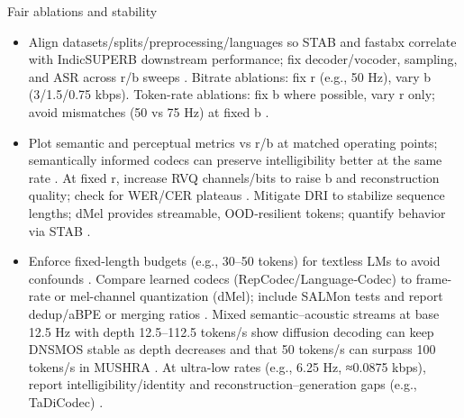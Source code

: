 \documentclass{article}
\begin{document}
Fair ablations and stability
\begin{itemize}
  \item Align datasets/splits/preprocessing/languages so STAB and fastabx correlate with IndicSUPERB downstream performance; fix decoder/vocoder, sampling, and ASR across r/b sweeps \cite{vashishth2024stabspeechtokenizerassessmentbenchmark,poli2025fastabxlibraryefficientcomputationabxdis,entry2025indicsuperbspeechprocessinguniversalperf}. Bitrate ablations: fix r (e.g., 50 Hz), vary b (3/1.5/0.75 kbps). Token-rate ablations: fix b where possible, vary r only; avoid mismatches (50 vs 75 Hz) at fixed b \cite{ahasan2025dmcodecdistillingmultimodalrepresentatio,li2024investigatingneuralaudiocodecsspeechlang}.
  \item Plot semantic and perceptual metrics vs r/b at matched operating points; semantically informed codecs can preserve intelligibility better at the same rate \cite{ye2024codecdoesmatterexploringsemanticshortcom}. At fixed r, increase RVQ channels/bits to raise b and reconstruction quality; check for WER/CER plateaus \cite{li2024investigatingneuralaudiocodecsspeechlang}. Mitigate DRI to stabilize sequence lengths; dMel provides streamable, OOD‑resilient tokens; quantify behavior via STAB \cite{bai2025dmelspeechtokenizationmadesimple,liu2024analyzingmitigatinginconsistencydiscrete,vashishth2024stabspeechtokenizerassessmentbenchmark}.
  \item Enforce fixed-length budgets (e.g., 30–50 tokens) for textless LMs to avoid confounds \cite{hsu2024exploringcontextlearningtextlessspeechla}. Compare learned codecs (RepCodec/Language‑Codec) to frame-rate or mel-channel quantization (dMel); include SALMon tests and report dedup/aBPE or merging ratios \cite{huang2024repcodecspeechrepresentationcodectokeniz,ji2025languagecodecbridgingdiscreterepresentat,zhang2025impactframeratesspeechtokenizercasestudy,maimon2025salmonsuiteacousticlanguagemodelevaluati}. Mixed semantic–acoustic streams at base 12.5 Hz with depth 12.5–112.5 tokens/s show diffusion decoding can keep DNSMOS stable as depth decreases and that 50 tokens/s can surpass 100 tokens/s in MUSHRA \cite{yang2025diffsoundstreamefficientspeechtokenizati,zeng2024scalingspeechtextpretrainingsyntheticint}. At ultra-low rates (e.g., 6.25 Hz, ≈0.0875 kbps), report intelligibility/identity and reconstruction–generation gaps (e.g., TaDiCodec) \cite{wang2025tadicodectextawarediffusionspeechtokeniz}.
\end{itemize}
\end{document}
